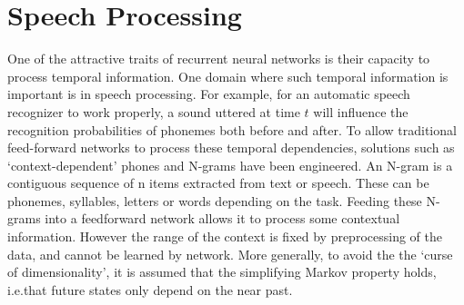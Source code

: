 \documentclass[12pt,oneside]{CUNY_CS_PhD}
\begin{document}

\section{Speech Processing}
One of the attractive traits of recurrent neural networks is their capacity to process temporal information. One domain where such temporal information is important is in speech processing. For example, for an automatic speech recognizer to work properly, a sound uttered at time $t$ will influence the recognition probabilities of phonemes both before and after. To allow traditional feed-forward networks to process these temporal dependencies, solutions such as `context-dependent' phones and
N-grams have been engineered. An N-gram is a contiguous sequence of n items extracted from text or speech. These can be phonemes, syllables, letters or words depending on the task. Feeding these N-grams into a feedforward network allows it to process some contextual information. However the range of the context is fixed by preprocessing of the data, and cannot be learned by network. More generally, to avoid the the `curse of dimensionality', it is assumed that the simplifying Markov property holds, i.e.that future states only depend on the near past.
\end{document}
